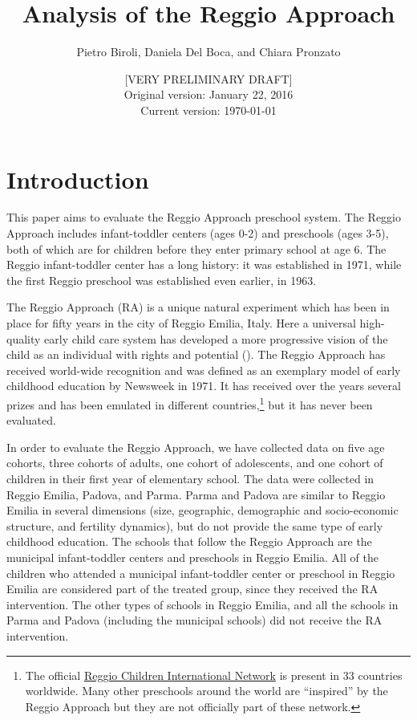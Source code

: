 \documentclass[12pt]{article}
\begin{document}
\title{Analysis of the Reggio Approach}
\author{Pietro Biroli, Daniela Del Boca, and Chiara Pronzato}
\date{[VERY PRELIMINARY DRAFT] \\
Original version: January 22, 2016 \\
Current version: \today }
\maketitle

\bigskip

\doublespacing

\section{Introduction}\label{sec:intro}

This paper aims to evaluate the Reggio Approach preschool system. The Reggio Approach includes infant-toddler centers (ages 0-2) and preschools (ages 3-5), both of which are for children before they enter primary school at age 6. The Reggio infant-toddler center has a long history: it was established in 1971, while the first Reggio preschool was established even earlier, in 1963.

The Reggio Approach (RA) is a unique natural experiment which has been in place for fifty years in the city of Reggio Emilia, Italy. Here a universal high-quality early child care system has developed a more progressive vision of the child as an individual with rights and potential (\cite{Malaguzzi1993}). The Reggio Approach has received world-wide recognition and was defined as an exemplary model of early childhood education by Newsweek in 1971. It has received over the years several prizes and has been emulated in different countries,\footnote{The official \href{http://www.reggiochildren.it/network/?lang=en}{Reggio Children International Network} is present in 33 countries worldwide. Many other preschools around the world are ``inspired'' by the Reggio Approach but they are not officially part of these network.} but it has never been evaluated.

In order to evaluate the Reggio Approach, we have collected data on five age cohorts, three cohorts of adults, one cohort of adolescents, and one cohort of children in their first year of elementary school. The data were collected in Reggio Emilia, Padova, and Parma. Parma and Padova are similar to Reggio Emilia in several dimensions (size, geographic, demographic and socio-economic structure, and fertility dynamics), but do not provide the same type of early childhood education. The schools that follow the Reggio Approach are the municipal infant-toddler centers and preschools in Reggio Emilia. All of the children who attended a municipal infant-toddler center or preschool in Reggio Emilia are considered part of the treated group, since they received the RA intervention. The other types of schools in Reggio Emilia, and all the schools in Parma and Padova (including the municipal schools) did not receive the RA intervention.
\end{document}
